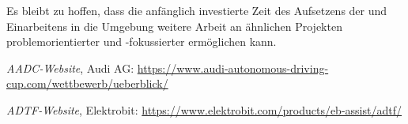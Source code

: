\documentclass[12pt, a4paper]{scrartcl}
\begin{document}
Es bleibt zu hoffen, dass die anfänglich investierte Zeit des Aufsetzens der und Einarbeitens in die Umgebung weitere Arbeit an ähnlichen Projekten problemorientierter und -fokussierter ermöglichen kann.


\newpage
{}
\listoffigures

\newpage
{}
\begin{thebibliography}{9}
	\textit{AADC-Website},
	Audi AG:
	\url{https://www.audi-autonomous-driving-cup.com/wettbewerb/ueberblick/}
	
	\textit{ADTF-Website},
	Elektrobit:
	\url{https://www.elektrobit.com/products/eb-assist/adtf/}
	
\end{thebibliography}

\end{document}
